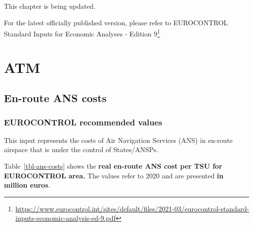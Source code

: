 \documentclass[
  11pt,
  a4paper,
]{book}
\DeclareRobustCommand{\href}[2]{#2\footnote{\url{#1}}}
\begin{document}
This chapter is being updated.

For the latest officially published version, please refer to
\href{https://www.eurocontrol.int/sites/default/files/2021-03/eurocontrol-standard-inputs-economic-analysis-ed-9.pdf}{EUROCONTROL
Standard Inputs for Economic Analyses - Edition 9}

\part{ATM}

\hypertarget{sec-en-route-ans-costs}{%
\chapter{En-route ANS costs}\label{sec-en-route-ans-costs}}

\hypertarget{eurocontrol-recommended-values-10}{%
\section{EUROCONTROL recommended
values}\label{eurocontrol-recommended-values-10}}

This input represents the costs of Air Navigation Services (ANS) in
en-route airspace that is under the control of States/ANSPs.

Table~\ref{tbl-ans-costs} shows the \textbf{real en-route ANS cost per
TSU for EUROCONTROL area.} The values refer to 2020 and are presented
\textbf{in million euros}.
\end{document}
